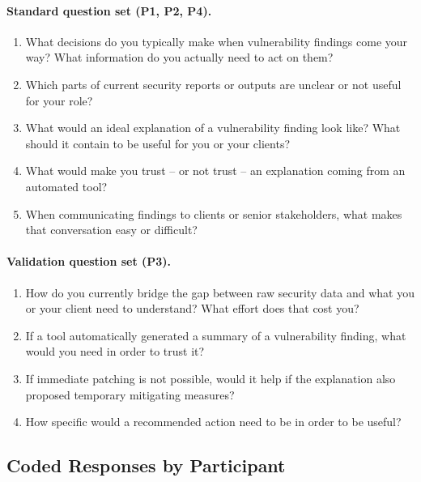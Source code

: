 \paragraph{Standard question set (P1, P2, P4).}

\begin{enumerate}
  \item What decisions do you typically make when vulnerability findings come your way? What information do you actually need to act on them?
  \item Which parts of current security reports or outputs are unclear or not useful for your role?
  \item What would an ideal explanation of a vulnerability finding look like? What should it contain to be useful for you or your clients?
  \item What would make you trust -- or not trust -- an explanation coming from an automated tool?
  \item When communicating findings to clients or senior stakeholders, what makes that conversation easy or difficult?
\end{enumerate}

\paragraph{Validation question set (P3).}

\begin{enumerate}[label=V\arabic*.]
  \item How do you currently bridge the gap between raw security data and what you or your client need to understand? What effort does that cost you?
  \item If a tool automatically generated a summary of a vulnerability finding, what would you need in order to trust it?
  \item If immediate patching is not possible, would it help if the explanation also proposed temporary mitigating measures?
  \item How specific would a recommended action need to be in order to be useful?
\end{enumerate}

\subsection*{Coded Responses by Participant}

